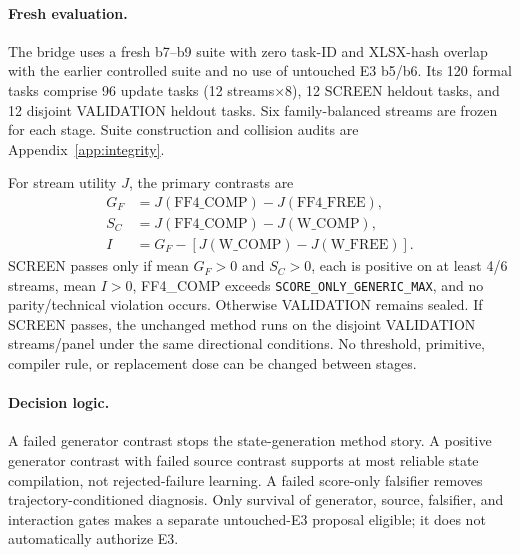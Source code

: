 \paragraph{Fresh evaluation.}
The bridge uses a fresh b7--b9 suite with zero task-ID and XLSX-hash overlap with the earlier controlled suite and no use of untouched E3 b5/b6. Its 120 formal tasks comprise 96 update tasks (12 streams$\times$8), 12 SCREEN heldout tasks, and 12 disjoint VALIDATION heldout tasks. Six family-balanced streams are frozen for each stage. Suite construction and collision audits are Appendix~\ref{app:integrity}.

For stream utility $J$, the primary contrasts are
\begin{align}
G_F &= J(\mathrm{FF4\_COMP})-J(\mathrm{FF4\_FREE}), \\
S_C &= J(\mathrm{FF4\_COMP})-J(\mathrm{W\_COMP}), \\
I &= G_F-[J(\mathrm{W\_COMP})-J(\mathrm{W\_FREE})].
\end{align}
SCREEN passes only if mean $G_F>0$ and $S_C>0$, each is positive on at least 4/6 streams, mean $I>0$, FF4\_COMP exceeds \texttt{SCORE\_ONLY\_GENERIC\_MAX}, and no parity/technical violation occurs. Otherwise VALIDATION remains sealed. If SCREEN passes, the unchanged method runs on the disjoint VALIDATION streams/panel under the same directional conditions. No threshold, primitive, compiler rule, or replacement dose can be changed between stages.

\paragraph{Decision logic.}
A failed generator contrast stops the state-generation method story. A positive generator contrast with failed source contrast supports at most reliable state compilation, not rejected-failure learning. A failed score-only falsifier removes trajectory-conditioned diagnosis. Only survival of generator, source, falsifier, and interaction gates makes a separate untouched-E3 proposal eligible; it does not automatically authorize E3.

